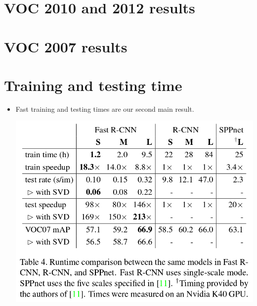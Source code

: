 \documentclass[11pt]{book}
\begin{document}
\section{VOC 2010 and 2012 results}
\label{sec-1-3-2}

    
\section{VOC 2007 results}
\label{sec-1-3-3}
\section{Training and testing time}
\label{sec-1-3-4}


\begin{itemize}
\item Fast training  and testing times are our second main result.

      \includegraphics[width=.9\linewidth]{./pic_fast_rcnn/table4.png}
\end{itemize}
\end{document}
